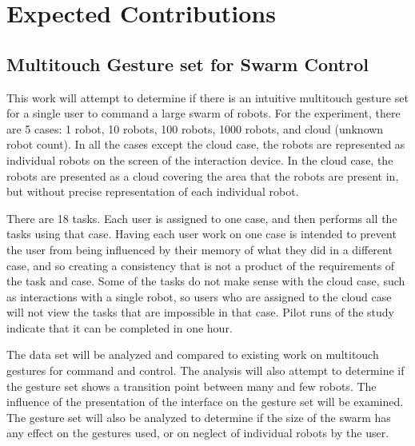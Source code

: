 \section{Expected Contributions}

\subsection{Multitouch Gesture set for Swarm Control}
This work will attempt to determine if there is an intuitive multitouch gesture set for a single user to command a large swarm of robots.
For the experiment, there are 5 cases: 1 robot, 10 robots, 100 robots, 1000 robots, and cloud (unknown robot count). 
In all the cases except the cloud case, the robots are represented as individual robots on the screen of the interaction device. 
In the cloud case, the robots are presented as a cloud covering the area that the robots are present in, but without precise representation of each individual robot. 

There are 18 tasks. 
Each user is assigned to one case, and then performs all the tasks using that case. 
Having each user work on one case is intended to prevent the user from being influenced by their memory of what they did in a different case, and so creating a consistency that is not a product of the requirements of the task and case. 
Some of the tasks do not make sense with the cloud case, such as interactions with a single robot, so users who are assigned to the cloud case will not view the tasks that are impossible in that case.
Pilot runs of the study indicate that it can be completed in one hour. 

The data set will be analyzed and compared to existing work on multitouch gestures for command and control. 
The analysis will also attempt to determine if the gesture set shows a transition point between many and few robots. 
The influence of the presentation of the interface on the gesture set will be examined. 
The gesture set will also be analyzed to determine if the size of the swarm has any effect on the gestures used, or on neglect of individual robots by the user. 

